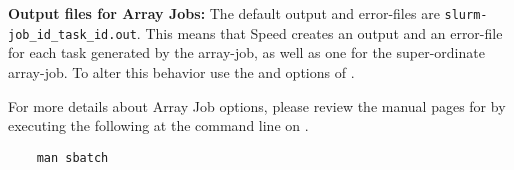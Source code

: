 \textbf{Output files for Array Jobs:}
The default output and error-files are \texttt{slurm-job\_id\_task\_id.out}.
This means that Speed creates an output and an error-file for each task generated by the array-job,
as well as one for the super-ordinate array-job.
To alter this behavior use the  and  options of .

For more details about Array Job options, please review the manual pages for 
by executing the following at the command line on .
\begin{verbatim}
    man sbatch
\end{verbatim}